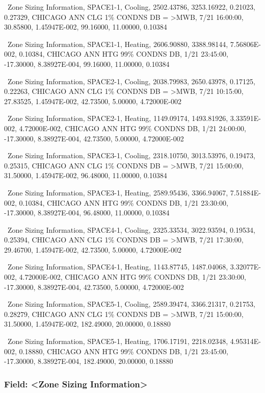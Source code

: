 ~Zone Sizing Information, SPACE1-1, Cooling, 2502.43786, 3253.16922, 0.21023, 0.27329, CHICAGO ANN CLG 1\% CONDNS DB = \textgreater{}MWB, 7/21 16:00:00, 30.85800, 1.45947E-002, 99.16000, 11.00000, 0.10384

~Zone Sizing Information, SPACE1-1, Heating, 2606.90880, 3388.98144, 7.56806E-002, 0.10384, CHICAGO ANN HTG 99\% CONDNS DB, 1/21 23:45:00, -17.30000, 8.38927E-004, 99.16000, 11.00000, 0.10384

~Zone Sizing Information, SPACE2-1, Cooling, 2038.79983, 2650.43978, 0.17125, 0.22263, CHICAGO ANN CLG 1\% CONDNS DB = \textgreater{}MWB, 7/21 10:15:00, 27.83525, 1.45947E-002, 42.73500, 5.00000, 4.72000E-002

~Zone Sizing Information, SPACE2-1, Heating, 1149.09174, 1493.81926, 3.33591E-002, 4.72000E-002, CHICAGO ANN HTG 99\% CONDNS DB, 1/21 24:00:00, -17.30000, 8.38927E-004, 42.73500, 5.00000, 4.72000E-002

~Zone Sizing Information, SPACE3-1, Cooling, 2318.10750, 3013.53976, 0.19473, 0.25315, CHICAGO ANN CLG 1\% CONDNS DB = \textgreater{}MWB, 7/21 15:00:00, 31.50000, 1.45947E-002, 96.48000, 11.00000, 0.10384

~Zone Sizing Information, SPACE3-1, Heating, 2589.95436, 3366.94067, 7.51884E-002, 0.10384, CHICAGO ANN HTG 99\% CONDNS DB, 1/21 23:30:00, -17.30000, 8.38927E-004, 96.48000, 11.00000, 0.10384

~Zone Sizing Information, SPACE4-1, Cooling, 2325.33534, 3022.93594, 0.19534, 0.25394, CHICAGO ANN CLG 1\% CONDNS DB = \textgreater{}MWB, 7/21 17:30:00, 29.46700, 1.45947E-002, 42.73500, 5.00000, 4.72000E-002

~Zone Sizing Information, SPACE4-1, Heating, 1143.87745, 1487.04068, 3.32077E-002, 4.72000E-002, CHICAGO ANN HTG 99\% CONDNS DB, 1/21 23:30:00, -17.30000, 8.38927E-004, 42.73500, 5.00000, 4.72000E-002

~Zone Sizing Information, SPACE5-1, Cooling, 2589.39474, 3366.21317, 0.21753, 0.28279, CHICAGO ANN CLG 1\% CONDNS DB = \textgreater{}MWB, 7/21 15:00:00, 31.50000, 1.45947E-002, 182.49000, 20.00000, 0.18880

~Zone Sizing Information, SPACE5-1, Heating, 1706.17191, 2218.02348, 4.95314E-002, 0.18880, CHICAGO ANN HTG 99\% CONDNS DB, 1/21 23:45:00, -17.30000, 8.38927E-004, 182.49000, 20.00000, 0.18880

\subsubsection{Field: \textless{}Zone Sizing Information\textgreater{}}\label{field-zone-sizing-information}

